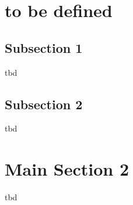 \section{to be defined}



\subsection{Subsection 1}

tbd



\subsection{Subsection 2}

tbd



\section{Main Section 2}

tbd